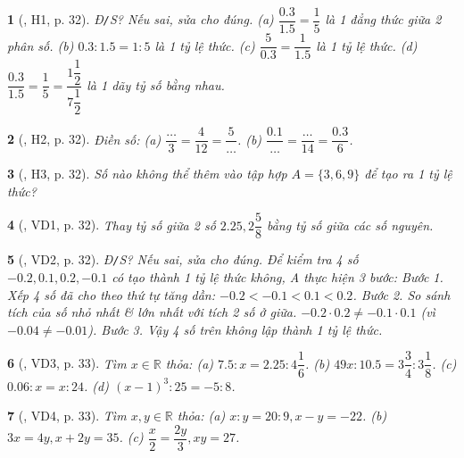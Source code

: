 \documentclass{article}
\newtheorem{baitoan}{}
\begin{document}
\begin{baitoan}[\cite{Binh_boi_duong_Toan_7_tap_1}, H1, p. 32]
	{\rm Đ{\tt/}S?} Nếu sai, sửa cho đúng. (a) $\dfrac{0.3}{1.5} = \dfrac{1}{5}$ là 1 đẳng thức giữa 2 phân số. (b) $0.3:1.5 = 1:5$ là 1 tỷ lệ thức. (c) $\dfrac{5}{0.3} = \dfrac{1}{1.5}$ là 1 tỷ lệ thức. (d) $\dfrac{0.3}{1.5} = \dfrac{1}{5} = \dfrac{1\dfrac{1}{2}}{7\dfrac{1}{2}}$ là 1 dãy tỷ số bằng nhau.
\end{baitoan}

\begin{baitoan}[\cite{Binh_boi_duong_Toan_7_tap_1}, H2, p. 32]
	Điền số: (a) $\dfrac{\ldots}{3} = \dfrac{4}{12} = \dfrac{5}{\ldots}$. (b) $\dfrac{0.1}{\ldots} = \dfrac{\ldots}{14} = \dfrac{0.3}{6}$.
\end{baitoan}

\begin{baitoan}[\cite{Binh_boi_duong_Toan_7_tap_1}, H3, p. 32]
	Số nào không thể thêm vào tập hợp $A = \{3,6,9\}$ để tạo ra 1 tỷ lệ thức?
\end{baitoan}

\begin{baitoan}[\cite{Binh_boi_duong_Toan_7_tap_1}, VD1, p. 32]
	Thay tỷ số giữa 2 số $2.25,2\dfrac{5}{8}$ bằng tỷ số giữa các số nguyên.
\end{baitoan}

\begin{baitoan}[\cite{Binh_boi_duong_Toan_7_tap_1}, VD2, p. 32]
	{\rm Đ{\tt/}S?} Nếu sai, sửa cho đúng. Để kiểm tra 4 số $-0.2,0.1,0.2,-0.1$ có tạo thành 1 tỷ lệ thức không, A thực hiện 3 bước: Bước 1. Xếp 4 số đã cho theo thứ tự tăng dần: $-0.2 < -0.1 < 0.1 < 0.2$. Bước 2. So sánh tích của số nhỏ nhất \& lớn nhất với tích 2 số ở giữa. $-0.2\cdot0.2\ne-0.1\cdot0.1$ (vì $-0.04\ne-0.01$). Bước 3. Vậy 4 số trên không lập thành 1 tỷ lệ thức.
\end{baitoan}

\begin{baitoan}[\cite{Binh_boi_duong_Toan_7_tap_1}, VD3, p. 33]
	Tìm $x\in\mathbb{R}$ thỏa: (a) $7.5:x = 2.25:4\dfrac{1}{6}$. (b) $49x:10.5 = 3\dfrac{3}{4}:3\dfrac{1}{8}$. (c) $0.06:x = x:24$. (d) $(x - 1)^3:25 = -5:8$.
\end{baitoan}

\begin{baitoan}[\cite{Binh_boi_duong_Toan_7_tap_1}, VD4, p. 33]
	Tìm $x,y\in\mathbb{R}$ thỏa: (a) $x:y = 20:9,x - y = -22$. (b) $3x = 4y,x + 2y = 35$. (c) $\dfrac{x}{2} = \dfrac{2y}{3},xy = 27$.
\end{baitoan}
\end{document}
